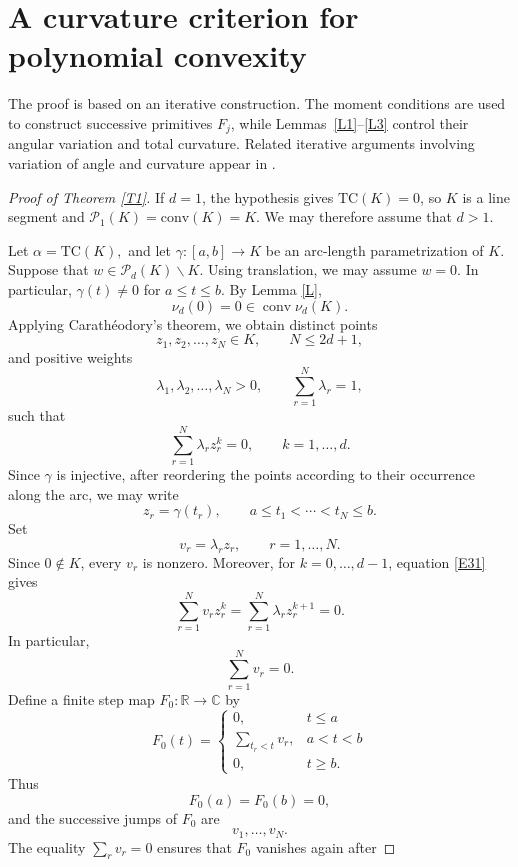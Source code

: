 \documentclass[10pt,a4paper]{amsart}
\newcommand{\Conv}{{\mathrm{conv}}}
\newcommand{\T}{\mathrm{TC}}
\newcommand{\cP}{\mathcal{P}}
\numberwithin{equation}{section}
\begin{document}
\section{A curvature criterion for polynomial convexity}

The proof is based on an iterative construction. The moment conditions
are used to construct successive primitives $F_j$, while
Lemmas~\ref{L1}--\ref{L3} control their angular variation and total
curvature. Related iterative arguments involving variation of angle
and curvature appear in \cite[Section~3.2]{KY}.

\begin{proof}[Proof of Theorem \ref{T1}] If $d=1$, the hypothesis gives $\T(K)=0$, so $K$ is a line segment and $\cP_1(K)=\Conv(K)=K$. We may therefore assume that $d>1$.

Let $\alpha=\T(K),$ and let $\gamma:[a,b]\longrightarrow K$ be an arc-length parametrization of $K$. Suppose that $w\in \cP_d(K)\backslash K.$ Using translation, we may assume $w=0$. In particular, $\gamma(t)\neq 0$  for $a\le  t\leq b$.
By Lemma \ref{L},
\[\nu_d(0)=0\in\operatorname{conv}\nu_d(K).
\]
Applying Carath\'eodory's theorem, we obtain distinct points
\[z_1,z_2,\ldots,z_N\in K, \qquad N\leq 2d+1,
\]
and positive weights
\[
    \lambda_1,\lambda_2,\ldots,\lambda_N>0,
    \qquad
    \sum_{r=1}^N\lambda_r=1,
\]
such that
\begin{equation}
    \sum_{r=1}^N\lambda_r z_r^k=0,\qquad k=1,\ldots,d.
    \label{E31}
\end{equation}
Since $\gamma$ is injective, after reordering the points according to
their occurrence along the arc, we may write
\[z_r=\gamma(t_r),\qquad a\leq t_1<\cdots<t_N\leq b.\]
Set
\[v_r=\lambda_r z_r,\qquad r=1,\ldots,N.\]
Since $0\notin K$, every $v_r$ is nonzero. Moreover, for
$k=0,\ldots,d-1$, equation \eqref{E31} gives
\begin{equation}
    \sum_{r=1}^N v_r z_r^k=\sum_{r=1}^N\lambda_r z_r^{k+1}=0.
    \label{E32}
\end{equation}
In particular,
\[\sum_{r=1}^N v_r=0.\]
Define a finite step map $F_0:\mathbb R\to\mathbb C$ by
\[F_0(t) = \begin{cases}
    0, & t\le a\\ 
    \displaystyle\sum_{t_r<t}v_r, & a<t<b \\
    0, & t\ge b.
\end{cases}
\]
Thus
\[F_0(a)=F_0(b)=0,\]
and the successive jumps of $F_0$ are
\[v_1,\ldots,v_N.\]
The equality $\sum_r v_r=0$ ensures that $F_0$ vanishes again after

\end{proof}
\end{document}
